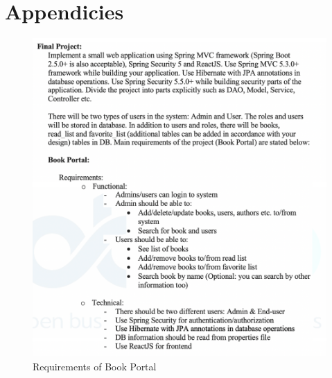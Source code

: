 \section{Appendicies}

\begin{figure}[H]
  \label{book-portal}
  \centering
  \includegraphics[width=\textwidth]{img/book-portal.png}
  \caption{Requirements of Book Portal}
\end{figure}

